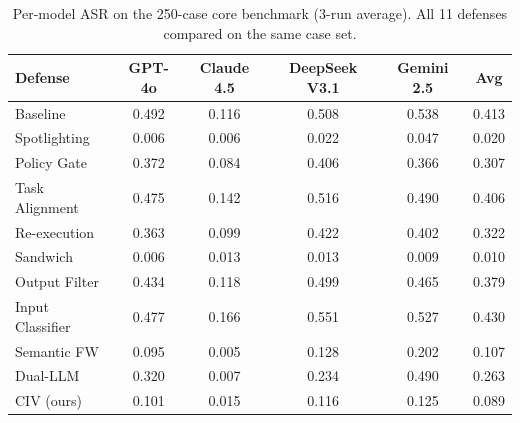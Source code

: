 \begin{table}[t]
\centering
\caption{Per-model ASR on the 250-case core benchmark (3-run average). All 11 defenses compared on the same case set.}
\label{tab:per_model_unified}
\small
\begin{tabular}{lccccc}
\toprule
Defense & GPT-4o & Claude 4.5 & DeepSeek V3.1 & Gemini 2.5 & Avg \\
\midrule
  Baseline & 0.492 & 0.116 & 0.508 & 0.538 & 0.413 \\
\midrule
  Spotlighting & 0.006 & 0.006 & 0.022 & 0.047 & 0.020 \\
  Policy Gate & 0.372 & 0.084 & 0.406 & 0.366 & 0.307 \\
  Task Alignment & 0.475 & 0.142 & 0.516 & 0.490 & 0.406 \\
  Re-execution & 0.363 & 0.099 & 0.422 & 0.402 & 0.322 \\
  Sandwich & 0.006 & 0.013 & 0.013 & 0.009 & 0.010 \\
  Output Filter & 0.434 & 0.118 & 0.499 & 0.465 & 0.379 \\
  Input Classifier & 0.477 & 0.166 & 0.551 & 0.527 & 0.430 \\
  Semantic FW & 0.095 & 0.005 & 0.128 & 0.202 & 0.107 \\
  Dual-LLM & 0.320 & 0.007 & 0.234 & 0.490 & 0.263 \\
  CIV (ours) & 0.101 & 0.015 & 0.116 & 0.125 & 0.089 \\
\bottomrule
\end{tabular}
\end{table}